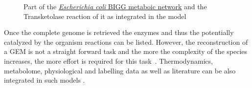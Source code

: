       \begin{figure}
         \hspace*{-1.75in}

         \caption[Part of the \textit{Escherichia coli} metaboic network and the Transketolase reaction]{
            Part of the \href{http://bigg.ucsd.edu/static/models/e_coli_core.xml}{\textit{Escherichia coli} BIGG metaboic network}  
            and the Transketolase reaction of it as integrated in the model}
         \label{fig:met_net}
      \end{figure}


      Once the complete genome is retrieved the enzymes and thus the potentially  
      catalyzed by the organism reactions can be listed. 
      However, the reconstruction of a GEM is not a straight forward task 
      and the more the complexity of the species increases, 
      the more effort is required for this task~\cite{thiele2010protocol}. 
      Thermodynamics, metabolome, physiological 
      and labelling data as well as literature can be also integrated in such models \cite{saldida2020unbiased}. 


